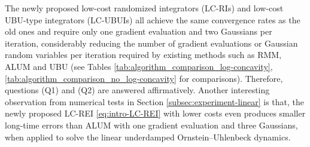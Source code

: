 \documentclass[12pt]{article}
\numberwithin{equation}{section}
\begin{document}
%
The newly proposed low-cost randomized integrators (LC-RIs) and low-cost UBU-type integrators (LC-UBUIs) all achieve the same convergence rates as the old ones and require only one gradient evaluation and two Gaussians per iteration, considerably reducing the number of gradient evaluations or Gaussian random variables per iteration required by existing methods such as RMM, ALUM and UBU (see Tables \ref{tab:algorithm_comparison_log-concavity}, \ref{tab:algorithm_comparison_no_log-concavity} for comparisons). 
Therefore, questions (Q1) and (Q2) are answered affirmatively.
%
Another interesting observation from numerical tests in Section \ref{subsec:experiment-linear} is that, the newly proposed LC-REI \eqref{eq:intro-LC-REI} with lower costs even produces smaller long-time errors than ALUM \cite{hu2021optimal} with one gradient evaluation and three Gaussians, when applied to solve the linear underdamped Ornstein--Uhlenbeck dynamics.
%
%
\end{document}
